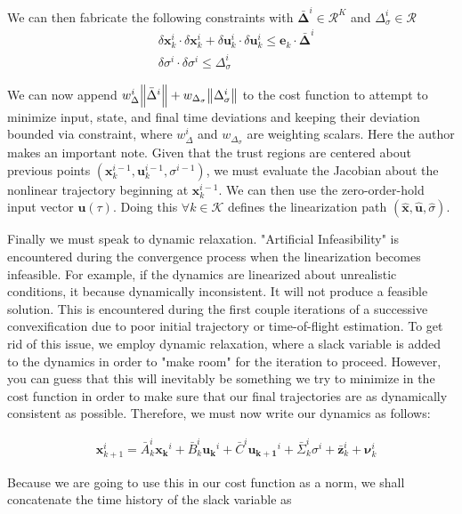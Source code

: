 We can then fabricate the following constraints with $\bm{\bar{\Delta}}^i \in \mathcal{R}^K$ and $\Delta_\sigma^i \in \mathcal{R}$
\begin{align}
& \delta \mathbf{x}_k^i \cdot \delta \mathbf{x}_k^i + \delta \mathbf{u}_k^i \cdot \delta \mathbf{u}_k^i \leq \mathbf{e}_k \cdot \bm{\bar{\Delta}}^i \\
& \delta \sigma^i \cdot \delta \sigma^i \leq \Delta_\sigma^i
\end{align}

We can now append $w_\Delta^i \norm{{\bar{\Delta}}^i} + w_{\Delta_\sigma}\norm{\Delta_\sigma^i}$ to the cost function to attempt to minimize input, state, and final time deviations and keeping their deviation bounded via constraint, where $w_\Delta^i$ and $w_{\Delta_\sigma}$ are weighting scalars.
Here the author makes an important note. Given that the trust regions are centered about previous points $(\mathbf{x}_{k}^{i-1},\mathbf{u}_{k}^{i-1},\sigma^{i-1})$, we must evaluate the Jacobian about the nonlinear trajectory beginning at $\mathbf{x}_{k}^{i-1}$. We can then use the zero-order-hold input vector $\mathbf{u}(\tau)$. Doing this $\forall k \in \mathcal{K}$ defines the linearization path $(\hat{\mathbf{x}}, \hat{\mathbf{u}}, \hat{\sigma})$.

Finally we must speak to dynamic relaxation. "Artificial Infeasibility" is  encountered during the convergence process when the linearization becomes infeasible. For example, if the dynamics are linearized about unrealistic conditions, it because dynamically inconsistent. It will not produce a feasible solution. This is encountered during the first couple iterations of a successive convexification due to poor initial trajectory or time-of-flight estimation. To get rid of this issue, we employ dynamic relaxation, where a slack variable is added to the dynamics in order to "make room" for the iteration to proceed. However, you can guess that this will inevitably be something we try to minimize in the cost function in order to make sure that our final trajectories are as dynamically consistent as possible. Therefore, we must now write our dynamics as follows: 

\begin{align}
& \mathbf{x}_{k+1}^i = \bar{A}_k^i\mathbf{x_k}^i + \bar{B}_k^i\mathbf{u_k}^i + \bar{C}^i\mathbf{u_{k+1}}^i + \bar{\Sigma}_k^i\sigma^i + \bar{\mathbf{z}}^i_k + \bm{\nu}_k^i
\end{align}

Because we are going to use this in our cost function as a norm, we shall concatenate the time history of the slack variable as

